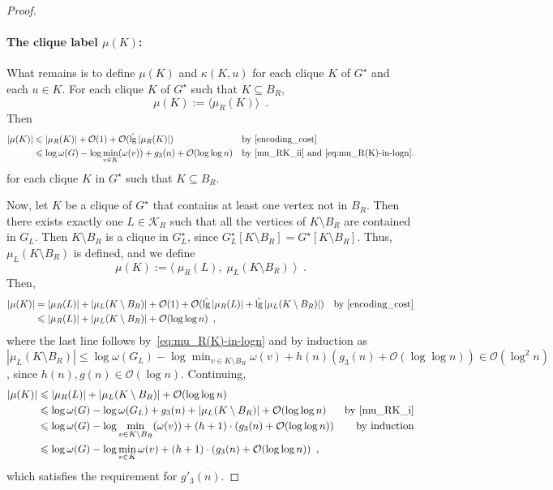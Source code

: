 \documentclass{patmorin}
\let\eqref\cref
\renewcommand{\le}{\leqslant}
\renewcommand{\leq}{\leqslant}
\DeclareMathOperator{\lgg}{\hat{lg}}
\newcommand{\Oh}{\calO}
\newcommand{\calK}{\mathcal{K}}
\newcommand{\calO}{\mathcal{O}}
\begin{document}
\begin{proof}
    \paragraph{\boldmath The clique label $\mu(K)$:}
    What remains is to define $\mu(K)$ and $\kappa(K,u)$ for each clique $K$ of $G^\star$ and each $u\in K$.  For each clique $K$ of $G^\star$ such that $K\subseteq B_R$,
    \[
       \mu(K) := \langle \mu_R(K)\rangle \enspace .
    \]
    Then
    \begin{align*}
    |\mu(K)| &\leq |\mu_R(K)| + \Oh(1) + \Oh(\lgg|\mu_R(K)|)&&\text{by~\eqref{encoding_cost}}\\
    &\leq \log\omega(G) - \log\min_{v\in K}(\omega(v)) + g_3(n) + \Oh(\log\log n)&&\textrm{by~\eqref{mu_RK_ii} and~\eqref{eq:mu_R(K)-in-logn}.}
    \end{align*}
    for each clique $K$ in $G^\star$ such that $K\subseteq B_R$.

    Now, let $K$ be a clique of $G^\star$ that contains at least one vertex not in $B_R$. Then there exists exactly one $L\in\calK_R$ such that all the vertices of $K\setminus B_R$ are contained in $G_L$. Then $K\setminus B_R$ is a clique in $G^\star_L$, since $G^\star_L[K\setminus B_R]=G^\star[K\setminus B_R]$. Thus, $\mu_L(K\setminus B_R)$ is defined, and we define
    \[
        \mu(K):= \langle\;\mu_R(L),\;\mu_{L}(K\setminus B_R)\;\rangle
        \enspace .
    \]
    Then,
    \begin{align*}
     |\mu(K)|
       & = |\mu_R(L)| + |\mu_{L}(K\setminus B_R)| + \Oh(1)+\Oh(\lgg|\mu_R(L)|+\lgg|\mu_L(K\setminus B_R)|)
       & \text{by \eqref{encoding_cost}} \\
       & \le |\mu_R(L)| + |\mu_{L}(K\setminus B_R)| + \Oh(\log\log n)\enspace,
       \end{align*}
       where the last line follows by~\eqref{eq:mu_R(K)-in-logn} and by induction as $|\mu_L(K\setminus B_R)|\leq \log\omega(G_L)-\log\min_{v\in K\setminus B_R}\omega(v) + h(n)(g_3(n)+\Oh(\log\log n)) \in\Oh(\log^2 n)$, since $h(n),g(n)\in\Oh(\log n)$. Continuing,
       \begin{align*}
       |\mu(K)| & \le |\mu_R(L)| + |\mu_{L}(K\setminus B_R)| + \Oh(\log\log n) \\
       & \le \log\omega(G)-\log \omega(G_{L}) + g_3(n) + |\mu_{L}(K\setminus B_R)| + \Oh(\log\log n)
       & \text{by \eqref{mu_RK_i}}\\
       & \le \log\omega(G) - \log\min_{v\in K\setminus B_R}(\omega(v)) + (h+1)\cdot (g_3(n) +  \Oh(\log\log n))
       & \text{by induction} \\
       & \le \log\omega(G) - \log\min_{v\in K}\omega(v) + (h+1)\cdot (g_3(n) + \Oh(\log\log n)) \enspace ,
    \end{align*}
    which satisfies the requirement for $g'_3(n)$.


\end{proof}
\end{document}
